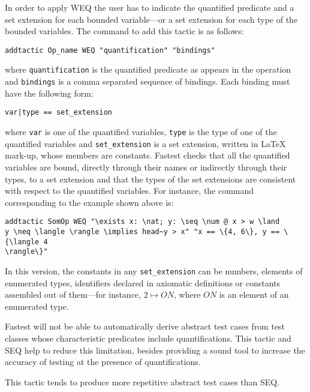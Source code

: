 In order to apply WEQ the user has to indicate the quantified predicate and a set extension for each bounded variable---or a set extension for each type of the bounded variables. The command to add this tactic is as follows:

\begin{verbatim}
addtactic Op_name WEQ "quantification" "bindings"
\end{verbatim}

\noindent where \verb+quantification+ is the quantified predicate as appears in the operation and \verb+bindings+ is a comma separated sequence of bindings. Each binding must have the following form:

\begin{verbatim}
var|type == set_extension
\end{verbatim}

\noindent where \verb+var+ is one of the quantified variables, \verb+type+ is the type of one of the quantified variables and \verb+set_extension+ is a set extension, written in \LaTeX{} mark-up, whose members are constants. Fastest checks that all the quantified variables are bound, directly through their names or indirectly through their types, to a set extension and that the types of the set extensions are consistent with respect to the quantified variables. For instance, the command corresponding to the example shown above is:

\begin{verbatim}
addtactic SomOp WEQ "\exists x: \nat; y: \seq \num @ x > w \land 
y \neq \langle \rangle \implies head~y > x" "x == \{4, 6\}, y == \{\langle 4 
\rangle\}"
\end{verbatim}

In this version, the constants in any \verb+set_extension+ can be numbers, elements of enumerated types, identifiers declared in axiomatic definitions or constants assembled out of them---for instance, $2 \mapsto ON$, where $ON$ is an element of an enumerated type. 

\vspace{5mm} Fastest will not be able to automatically derive abstract test cases from test classes whose characteristic predicates include quantifications. This tactic and SEQ help to reduce this limitation, besides providing a sound tool to increase the accuracy of testing at the presence of quantifications.\vspace{5mm}

\vspace{5mm} This tactic tends to produce more repetitive abstract test cases than SEQ.\vspace{5mm}

